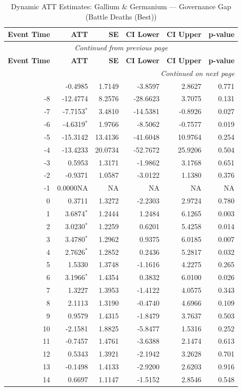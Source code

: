 \begin{longtable}{rrrrrr}
\caption{Dynamic ATT Estimates: Gallium \& Germanium --- Governance Gap (Battle Deaths (Best))} \label{tab:gallium_germanium_battle_deaths_best_} \\
\toprule
\textbf{Event Time} & \textbf{ATT} & \textbf{SE} & \textbf{CI Lower} & \textbf{CI Upper} & \textbf{p-value} \\
\midrule
\endfirsthead
\multicolumn{6}{c}{\textit{Continued from previous page}} \\
\toprule
\textbf{Event Time} & \textbf{ATT} & \textbf{SE} & \textbf{CI Lower} & \textbf{CI Upper} & \textbf{p-value} \\
\midrule
\endhead
\midrule \multicolumn{6}{r}{\textit{Continued on next page}} \\
\endfoot
\bottomrule
\endlastfoot
-9 & -0.4985 & 1.7149 & -3.8597 & 2.8627 & 0.771 \\
-8 & -12.4774 & 8.2576 & -28.6623 & 3.7075 & 0.131 \\
-7 & -7.7153$^{*}$ & 3.4810 & -14.5381 & -0.8926 & 0.027 \\
-6 & -4.6319$^{*}$ & 1.9766 & -8.5062 & -0.7577 & 0.019 \\
-5 & -15.3142 & 13.4136 & -41.6048 & 10.9764 & 0.254 \\
-4 & -13.4233 & 20.0734 & -52.7672 & 25.9206 & 0.504 \\
-3 & 0.5953 & 1.3171 & -1.9862 & 3.1768 & 0.651 \\
-2 & -0.9371 & 1.0587 & -3.0122 & 1.1380 & 0.376 \\
-1 & 0.0000NA & NA & NA & NA & NA \\
0 & 0.3711 & 1.3272 & -2.2303 & 2.9724 & 0.780 \\
1 & 3.6874$^{*}$ & 1.2444 & 1.2484 & 6.1265 & 0.003 \\
2 & 3.0230$^{*}$ & 1.2259 & 0.6201 & 5.4258 & 0.014 \\
3 & 3.4780$^{*}$ & 1.2962 & 0.9375 & 6.0185 & 0.007 \\
4 & 2.7626$^{*}$ & 1.2852 & 0.2436 & 5.2817 & 0.032 \\
5 & 1.5330 & 1.3748 & -1.1616 & 4.2275 & 0.265 \\
6 & 3.1966$^{*}$ & 1.4354 & 0.3832 & 6.0100 & 0.026 \\
7 & 1.3227 & 1.3953 & -1.4122 & 4.0575 & 0.343 \\
8 & 2.1113 & 1.3190 & -0.4740 & 4.6966 & 0.109 \\
9 & 0.9579 & 1.4315 & -1.8479 & 3.7637 & 0.503 \\
10 & -2.1581 & 1.8825 & -5.8477 & 1.5316 & 0.252 \\
11 & -0.7457 & 1.4761 & -3.6388 & 2.1474 & 0.613 \\
12 & 0.5343 & 1.3921 & -2.1942 & 3.2628 & 0.701 \\
13 & -0.1498 & 1.4133 & -2.9200 & 2.6203 & 0.916 \\
14 & 0.6697 & 1.1147 & -1.5152 & 2.8546 & 0.548 \\
\end{longtable}
